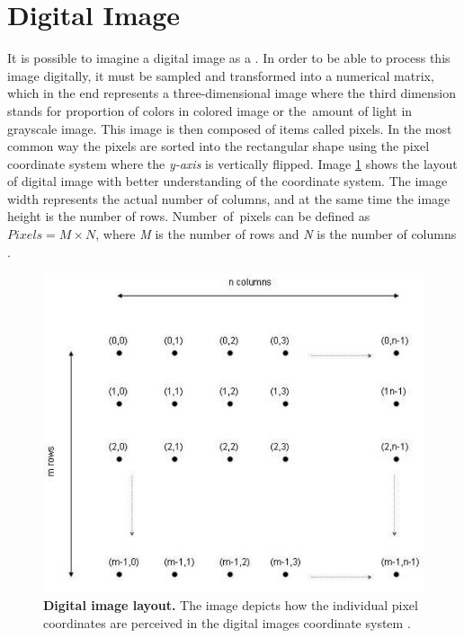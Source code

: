 \section{Digital Image}
It is possible to imagine a digital image as a \textit{} \cite{image-processing-intro3}. In order to be able to process this image digitally, it must be sampled and transformed into a numerical matrix, which in the end represents a three-dimensional image where the third dimension stands for proportion of colors in colored image or the~amount of light in grayscale image. This image is then composed of items called pixels. In the most common way the pixels are sorted into the rectangular shape using the pixel coordinate system where the \textit{y-axis} is vertically flipped. Image \ref{digital-img} shows the layout of digital image with better understanding of the coordinate system. The image width represents the actual number of columns, and at the same time the image height is the number of rows.  Number~of~pixels can be defined as $ Pixels = M \times N $, where \textit{M} is the number of rows and \textit{N} is the number of columns \cite{image-processing-intro4}.
\begin{figure}[ht]
  \centering
  \includegraphics[width=.66\textwidth]{obrazky-figures/digtal-img-imatrix.pdf}
  \caption{\textbf{Digital image layout.} The image depicts how the individual pixel coordinates are perceived in the digital images coordinate system \cite{digital-img}.}
  \label{digital-img}
\end{figure}

